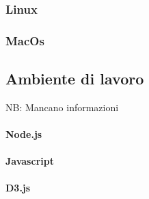 \documentclass[../manuale_sviluppatore.tex]{subfiles}
\begin{document}
\subsubsection{Linux}
    \label{subsub:linux_inst}

\subsubsection{MacOs}
    \label{subsub:mac_inst}

\subsection{Ambiente di lavoro}
NB: Mancano informazioni

\paragraph{Node.js}

\paragraph{Javascript}

\paragraph{D3.js}
\end{document}
